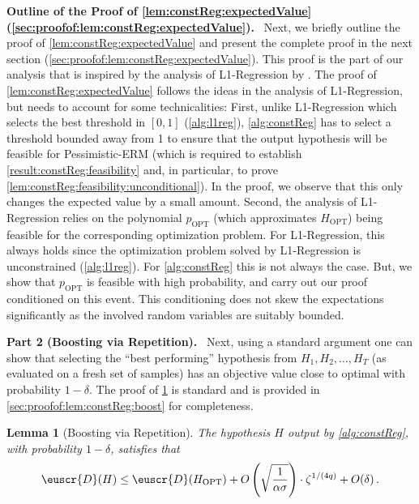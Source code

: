 \documentclass[11pt]{article}
\theoremstyle{plain}
\newtheorem{lemma}[theorem]{Lemma}
\theoremstyle{definition}
\theoremstyle{remark}
\newcommand{\inparen}[1]{\left(#1\right)}
\newcommand{\opt}{\ensuremath{\mathrm{OPT}}}
\newcommand{\customcal}[1]{\euscr{#1}}
\newcommand{\cD}{\customcal{D}}
\renewcommand{\paragraph}[1]{\medskip \noindent\textbf{#1}~}
\newcommand{\pERM}{Pessimistic-ERM}
\newcommand{\lreg}{\textsf{L1-Regression}}
\begin{document}
            \paragraph{Outline of the Proof of \cref{lem:constReg:expectedValue} (\cref{sec:proofof:lem:constReg:expectedValue}).}
            Next, we briefly outline the proof of \cref{lem:constReg:expectedValue} and present the complete proof in the next section (\cref{sec:proofof:lem:constReg:expectedValue}).
            This proof is the part of our analysis that is inspired by the analysis of \lreg{} by \citet*{kalai2008agnostically}.
            The proof of \cref{lem:constReg:expectedValue} follows the ideas in the analysis of \lreg{}, but needs to account for some technicalities:
            First, unlike \lreg{} which selects the best threshold in $[0,1]$ (\cref{alg:l1reg}), \cref{alg:constReg} has to select a threshold bounded away from 1 to ensure that the output hypothesis will be feasible for \pERM{} (which is required to establish \cref{result:constReg:feasibility} and, in particular, to prove \cref{lem:constReg:feasibility:unconditional}).
            In the proof, we observe that this only changes the expected value by a small amount.
            Second, the analysis of \lreg{} relies on the polynomial $p_{\opt}$ (which approximates $H_{\opt}$) being feasible for the corresponding optimization problem.
            For \lreg{}, this always holds since the optimization problem solved by \lreg{} is unconstrained (\cref{alg:l1reg}).
            For \cref{alg:constReg} this is not always the case.
            But, we show that $p_{\opt}$ is feasible with high probability, and carry out our proof conditioned on this event.
            This conditioning does not skew the expectations significantly as the involved random variables are suitably bounded. 

        
        \paragraph{Part 2 (Boosting via Repetition).}
        Next, using a standard argument one can show that selecting the ``best performing'' hypothesis from $H_1,H_2,\dots,H_T$ (as evaluated on a fresh set of samples) has an objective value close to optimal with probability $1-\delta$.
        The proof of \cref{lem:constReg:boost} is standard and is provided in \cref{sec:proofof:lem:constReg:boost} for completeness.
        \begin{lemma}[Boosting via Repetition]\label{lem:constReg:boost}
            The hypothesis $H$ output by \cref{alg:constReg}, with probability $1-\delta$, satisfies that 
            \[
                \cD(H)
                \leq 
                \cD(H_{\opt})
                +  
                O\inparen{\sqrt{\frac{1}{\alpha\sigma}}}
                \cdot \zeta^{1/(4q)}
                +
                    O(\delta)
                \,.
            \]
        \end{lemma}
\end{document}
